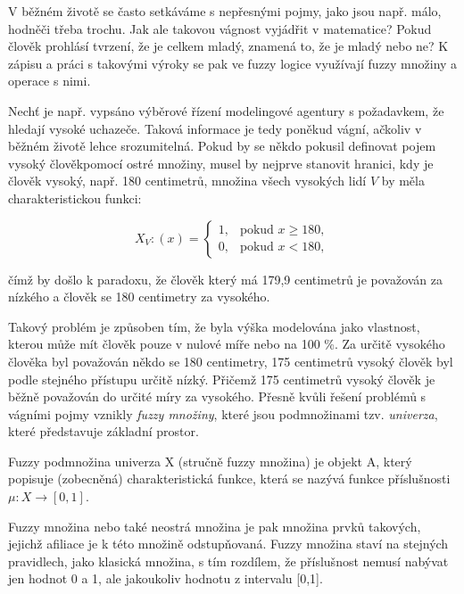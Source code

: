 V běžném životě se často setkáváme s nepřesnými pojmy, jako jsou např. \clqq málo\crqq, \clqq hodně\crqq \space či třeba \clqq trochu\crqq. Jak ale takovou vágnost vyjádřit v matematice? Pokud člověk prohlásí tvrzení, že je \clqq celkem mladý\crqq, znamená to, že je mladý nebo ne? K zápisu a práci s takovými výroky se pak ve fuzzy logice využívají fuzzy množiny a operace s nimi.

Nech\v t je např. vypsáno výběrové řízení modelingové agentury s požadavkem, že hledají vysoké uchazeče. Taková informace je tedy poněkud vágní, ačkoliv v běžném životě lehce srozumitelná. Pokud by se někdo pokusil definovat pojem \clqq vysoký člověk\crqq \space pomocí ostré množiny, musel by nejprve stanovit hranici, kdy je člověk vysoký, např. 180 centimetr\r u, množina všech vysokých lidí $V$ by měla charakteristickou funkci:

    $$X_V:(x)=\begin{cases} 1, & \mbox{pokud }  x \geq 180,\\    0, & \mbox{pokud } x < 180,  \end{cases}$$

    čímž by došlo k paradoxu, že člověk který má 179,9 centimetr\r u je považován za nízkého a člověk se 180 centimetry za vysokého.

    Takový problém je zp\r usoben tím, že byla výška modelována jako vlastnost, kterou m\r uže mít člověk pouze v nulové míře nebo na 100 \%. Za určitě vysokého člověka byl považován někdo se 180 centimetry, 175 centimetr\r u vysoký člověk byl podle stejného přístupu určitě n\'izk\'y. Přičemž 175 centimetr\r u vysoký člověk je běžně považován do určité míry za vysokého. Přesně kvůli řešení problémů s vágními pojmy vznikly \textit{fuzzy množiny}, které jsou podmno\v zinami tzv. \textit{univerza}, které p\v redstavuje základní prostor. 
    
    \begin{definition}
    \cite{navara}
        Fuzzy podmnožina univerza X (stručně fuzzy množina) je objekt A, který popisuje (zobecněná) charakteristická funkce, která se nazývá funkce příslušnosti $\mu: X \rightarrow [0,1]$. 
    \end{definition}
    
    Fuzzy množina nebo také neostrá množina je pak množina prvků takových, jejichž afiliace je k této množině odstupňovaná. Fuzzy množina staví na stejných pravidlech, jako klasická množina, s tím rozdílem, že příslušnost nemusí nabývat jen hodnot 0 a 1, ale jakoukoliv hodnotu z intervalu [0,1]. 
   
